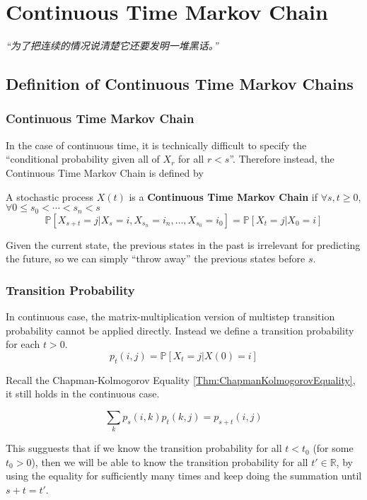 \chapter{Continuous Time Markov Chain}
\emph{“为了把连续的情况说清楚它还要发明一堆黑话。”}
\newpage


\section{Definition of Continuous Time Markov Chains}
    \subsection{Continuous Time Markov Chain}
        In the case of continuous time, it is technically difficult to specify the ``conditional probability given all of $X_r$ for all $r<s$''. Therefore instead, the Continuous Time Markov Chain is defined by

        \begin{definition}\label{Def:ContinuousTimeMarkovChain}
            A stochastic process $X(t)$ is a \textbf{Continuous Time Markov Chain} if $\forall s,t \ge 0$, $\forall 0 \le s_0 < \cdots < s_n < s$
            \[ \mathbb{P}[X_{s+t} = j | X_s = i, X_{s_n} = i_n,\dots,X_{s_0}=i_0] = \mathbb{P}[X_t=j | X_0 = i] \]
        \end{definition}

        Given the current state, the previous states in the past is irrelevant for predicting the future, so we can simply ``throw away'' the previous states before $s$.

    \subsection{Transition Probability}
        In continuous case, the matrix-multiplication version of multistep transition probability cannot be applied directly. Instead we define a transition probability for each $t>0$.
        \[ p_t(i,j) = \mathbb{P}[X_t=j|X(0)=i] \]

        Recall the Chapman-Kolmogorov Equality \ref{Thm:ChapmanKolmogorovEquality}, it still holds in the continuous case.

        \begin{theorem}\label{Thm:ContinuousChapmanKolmogorovEquality}
            \[ \sum_{k}p_s(i,k)p_t(k,j) = p_{s+t}(i,j) \]
        \end{theorem}
        \begin{remark}
            This sugguests that if we know the transition probability for all $t<t_0$ (for some $t_0>0$), then we will be able to know the transition probability for all $t' \in \mathbb{R}$, by using the equality for sufficiently many times and keep doing the summation until $s+t=t'$.
        \end{remark}

